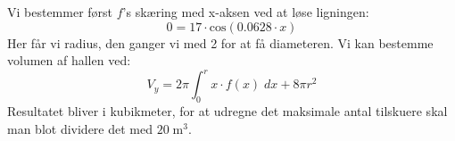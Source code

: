 \begin{tcolorbox}[title=Opgave 5,
    colback=blue!1!white,
    colframe=black,
    colbacktitle=blue!25!white,
    coltitle=red!25!black,
    fonttitle=\bfseries,
    subtitle style={boxrule=0.4pt,
    colback=blue!7!white} ]
        Vi bestemmer først \(f\)'s skæring med x-aksen ved at løse ligningen:
        \[0=17\cdot \text{cos}(0.0628\cdot x)\]
        Her får vi radius, den ganger vi med 2 for at få diameteren.
        Vi kan bestemme volumen af hallen ved:
        \[V_y = 2 \pi \int _0 ^r x\cdot f(x) \; dx + 8\pi r^2\]
        Resultatet bliver i kubikmeter, for at udregne det maksimale antal tilskuere skal man blot dividere det med \(20\; \text{m}^3\).
\end{tcolorbox}